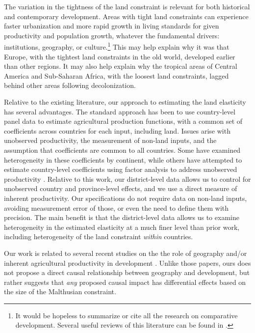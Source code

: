 \documentclass[11pt]{article}
\begin{document}
The variation in the tightness of the land constraint is relevant for both historical and contemporary development. Areas with tight land constraints can experience faster urbanization and more rapid growth in living standards for given productivity and population growth, whatever the fundamental drivers: institutions, geography, or culture.\footnote{It would be hopeless to summarize or cite all the research on comparative development. Several useful reviews of this literature can be found in \cite{ajr2005handbook,nunn_2009,Galor:2011uq,sw2013,vries2013}.} This may help explain why it was that Europe, with the tightest land constraints in the old world, developed earlier than other regions. It may also help explain why the tropical areas of Central America and Sub-Saharan Africa, with the loosest land constraints, lagged behind other areas following decolonization.

Relative to the existing literature, our approach to estimating the land elasticity has several advantages. The standard approach has been to use country-level panel data \citep{Hayami:1970ly,Hayami:1985cr,cpr1997,mm2001,Mundlak:2000dq,mbl2012,et2013mango} to estimate agricultural production functions, with a common set of coefficients across countries for each input, including land. Issues arise with unobserved productivity, the measurement of non-land inputs, and the assumption that coefficients are common to all countries. Some have examined heterogeneity in these coefficients \citep{gg2003,Wiebe2003Resource-Qualit} by continent, while others have attempted to estimate country-level coefficients using factor analysis to address unobserved productivity \citep{et2013mango,ev2016clim}. Relative to this work, our district-level data allows us to control for unobserved country and province-level effects, and we use a direct measure of inherent productivity. Our specifications do not require data on non-land inputs, avoiding measurement error of those, or even the need to define them with precision. The main benefit is that the district-level data allows us to examine heterogeneity in the estimated elasticity at a much finer level than prior work, including heterogeneity of the land constraint \textit{within} countries. 

Our work is related to several recent studies on the the role of geography and/or inherent agricultural productivity in development \citep{oh2005,ashraf2010dynamics,Nunn2011,Nunn2012,mich2012,agn2013,cook14,cook2014role,fenske2014,alsan2015,ashrafmich2015,dks2015,galorozak2016,litina2016,ads2016,FrankemaPap2017}. Unlike those papers, ours does not propose a direct causal relationship between geography and development, but rather suggests that \textit{any} proposed causal impact has differential effects based on the size of the Malthusian constraint. 
\end{document}
